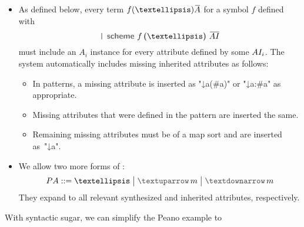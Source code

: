 \documentclass[letterpaper,11pt]{article}
\begin{document}
\begin{notation}
\begin{itemize}
  \item As defined below, every term $f(…)\ov{A}$ for a symbol $f$ defined with
    \begin{displaymath}
      \kw{\texttt{|} scheme}~f\,\kw(…\kw)~\ov{\set{AI}}
    \end{displaymath}
    must include an $A_i$ instance for every attribute defined by some $AI_i$.  The system
    automatically includes missing inherited attributes as follows:
    \begin{itemize}
    \item In patterns, a missing attribute is inserted as "↓a(#a)" or "↓a{:#a}" as appropriate.
    \item Missing attributes that were defined in the pattern are inserted the same.
    \item Remaining missing attributes must be of a map sort and are inserted as~"↓a{}".
    \end{itemize}

  \item We allow two more forms of :
    \begin{displaymath}
      \set{PA} ::= {…} \bigm| \kw{$↑$}\,m \bigm| \kw{$↓$}\,m
    \end{displaymath}
    They expand to all relevant synthesized and inherited attributes, respectively.

  \end{itemize}
\end{notation}

\begin{example}
  With syntactic sugar, we can simplify the Peano example to
\end{example}
\end{document}
